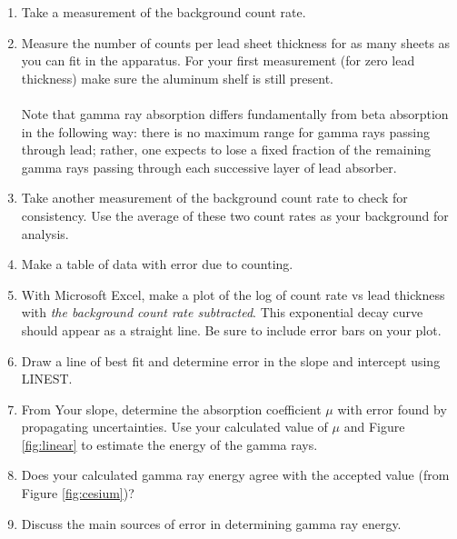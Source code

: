 \begin{enumerate}
  \item Take a measurement of the background count rate.
  \item Measure the number of counts per lead sheet thickness for as many sheets as you can fit in the apparatus. For your first measurement (for zero lead thickness) make sure the aluminum shelf is still present.\\ \\
  Note that gamma ray absorption differs fundamentally from beta absorption in the following way: there is no maximum range for gamma rays passing through lead; rather, one expects to lose a fixed fraction of the remaining gamma rays passing through each successive layer of lead absorber.

  \item Take another measurement of the background count rate to check for consistency. Use the average of these two count rates as your background for analysis.
  \item Make a table of data with error due to counting.
  \item With Microsoft Excel, make a plot of the log of count rate vs lead thickness with \emph{the  background count rate subtracted}. This exponential decay curve should appear as a straight line. Be sure to include error bars on your plot.
  \item Draw a line of best fit and determine error in the slope and intercept using LINEST.
  \item From Your slope, determine the absorption coefficient $\mu$ with error found by propagating uncertainties. Use your calculated value of $\mu$ and Figure \ref{fig:linear} to estimate the energy of the gamma rays.
  \item Does your calculated gamma ray energy agree with the accepted value (from Figure \ref{fig:cesium})?
  \item Discuss the main sources of error in determining gamma ray energy.
\end{enumerate}
